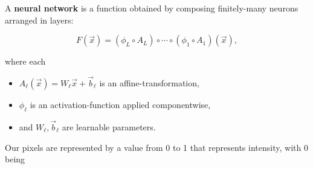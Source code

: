 \documentclass{article}
\begin{document}
\begin{definition}
A \textbf{neural network} is a function obtained by \@{composing} \@{finitely-many} \@{neurons} arranged in \@{layers}:

\[ F(\vec{x}) = (\phi_L \circ A_L) \circ \cdots \circ (\phi_1 \circ A_1)(\vec{x}), \]

where each

\begin{itemize}
\item $A_{\ell}(\vec{x}) = W_{\ell} \vec{x} + \vec{b}_{\ell}$ is an \@{affine-transformation},
\end{itemize}

\begin{itemize}
\item $\phi_{\ell}$ is an \@{activation-function} applied \@{componentwise},
\end{itemize}

\begin{itemize}
\item and $W_{\ell}, \vec{b}_{\ell}$ are learnable parameters.
\end{itemize}
\end{definition}

Our pixels are represented by a value from 0 to 1 that represents intensity, with 0 being
\end{document}

